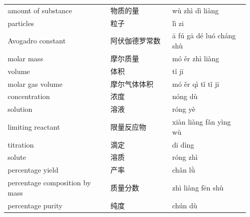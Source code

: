 \documentclass[11pt]{article}
\begin{document}
\begin{longtable}{@{}p{0.40\linewidth}p{0.24\linewidth}p{0.30\linewidth}@{}}
amount of substance & 物质的量 & wù zhì dì liàng \\
particles & 粒子 & lì zi \\
Avogadro constant & 阿伏伽德罗常数 & ā fú gā dé luó cháng shù \\
molar mass & 摩尔质量 & mó ěr zhì liàng \\
volume & 体积 & tǐ jī \\
molar gas volume & 摩尔气体体积 & mó ěr qì tǐ tǐ jī \\
concentration & 浓度 & nóng dù \\
solution & 溶液 & róng yè \\
limiting reactant & 限量反应物 & xiàn liàng fǎn yìng wù \\
titration & 滴定 & dī dìng \\
solute & 溶质 & róng zhì \\
percentage yield & 产率 & chǎn lǜ \\
percentage composition by mass & 质量分数 & zhì liàng fēn shù \\
percentage purity & 纯度 & chún dù \\
\end{longtable}
\end{document}
